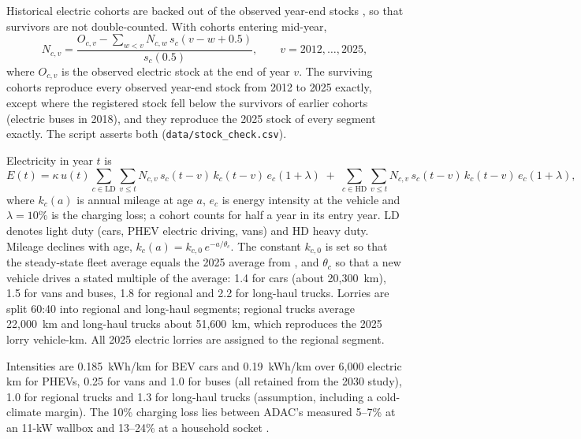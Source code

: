 \documentclass[11pt,a4paper]{article}
\begin{document}
Historical electric cohorts are backed out of the observed year-end stocks \citep{statfin2026_11ie}, so that survivors are not double-counted. With cohorts entering mid-year,
\begin{equation}\label{eq:cohorts}
N_{c,v}=\frac{O_{c,v}-\sum_{w<v}N_{c,w}\,s_c(v-w+0.5)}{s_c(0.5)},\qquad v=2012,\dots,2025,
\end{equation}
where $O_{c,v}$ is the observed electric stock at the end of year $v$. The surviving cohorts reproduce every observed year-end stock from 2012 to 2025 exactly, except where the registered stock fell below the survivors of earlier cohorts (electric buses in 2018), and they reproduce the 2025 stock of every segment exactly. The script asserts both (\texttt{data/stock\_check.csv}).

Electricity in year $t$ is
\begin{equation}\label{eq:energy}
E(t)=\kappa\,u(t)\sum_{c\in\mathrm{LD}}\sum_{v\le t}N_{c,v}\,s_c(t-v)\,k_c(t-v)\,e_c(1+\lambda)\;+\;\sum_{c\in\mathrm{HD}}\sum_{v\le t}N_{c,v}\,s_c(t-v)\,k_c(t-v)\,e_c(1+\lambda),
\end{equation}
where $k_c(a)$ is annual mileage at age $a$, $e_c$ is energy intensity at the vehicle and $\lambda=10\%$ is the charging loss; a cohort counts for half a year in its entry year. LD denotes light duty (cars, PHEV electric driving, vans) and HD heavy duty. Mileage declines with age, $k_c(a)=k_{c,0}\,e^{-a/\theta_c}$. The constant $k_{c,0}$ is set so that the steady-state fleet average equals the 2025 average from \citet{statfin2026_12jx}, and $\theta_c$ so that a new vehicle drives a stated multiple of the average: 1.4 for cars (about 20,300~km), 1.5 for vans and buses, 1.8 for regional and 2.2 for long-haul trucks. Lorries are split 60:40 into regional and long-haul segments; regional trucks average 22,000~km and long-haul trucks about 51,600~km, which reproduces the 2025 lorry vehicle-km. All 2025 electric lorries are assigned to the regional segment.

Intensities are 0.185~kWh/km for BEV cars and 0.19~kWh/km over 6,000 electric km for PHEVs, 0.25 for vans and 1.0 for buses (all retained from the 2030 study), 1.0 for regional trucks \citep{oeko2025elv} and 1.3 for long-haul trucks (assumption, including a cold-climate margin). The 10\% charging loss lies between ADAC's measured 5--7\% at an 11-kW wallbox and 13--24\% at a household socket \citep{popa2026adac}.
\end{document}

